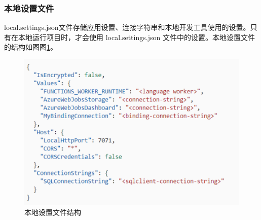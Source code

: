 \documentclass[11pt]{article}
\begin{document}
\subsubsection{本地设置文件} 
local.settings.json文件存储应用设置、连接字符串和本地开发工具使用的设置。只有在本地运行项目时，才会使用 local.settings.json 文件中的设置。本地设置文件的结构如图图\ref{fig4}。

\begin{figure}[h]	
	\centering
	\includegraphics[scale=0.6]{figs/4.png}        %
	\caption{本地设置文件结构}
	\label{fig4}	
\end{figure}
\end{document}

